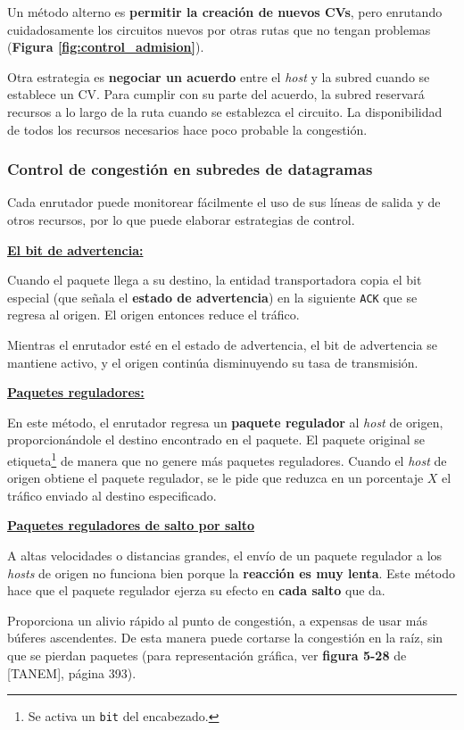 \documentclass[10pt,a4paper]{article}
\begin{document}
Un método alterno es \textbf{permitir la creación de nuevos CVs}, pero enrutando cuidadosamente los circuitos nuevos por otras rutas que no tengan problemas (\textbf{Figura \ref{fig:control_admision}}).

Otra estrategia es \textbf{negociar un acuerdo} entre el \textit{host} y la subred cuando se establece un CV. Para cumplir con su parte del acuerdo, la subred reservará recursos a lo largo de la ruta cuando se establezca el circuito. La disponibilidad de todos los recursos necesarios hace poco probable la congestión.

\subsubsection{Control de congestión en subredes de datagramas}

Cada enrutador puede monitorear fácilmente el uso de sus líneas de salida y de otros recursos, por lo que puede elaborar estrategias de control.

\underline{\textbf{El bit de advertencia:}}

Cuando el paquete llega a su destino, la entidad transportadora copia el bit especial (que señala el \textbf{estado de advertencia}) en la siguiente \texttt{ACK} que se regresa al origen. El origen entonces reduce el tráfico.

Mientras el enrutador esté en el estado de advertencia, el bit de advertencia se mantiene activo, y el origen continúa disminuyendo su tasa de transmisión.

\underline{\textbf{Paquetes reguladores:}}

En este método, el enrutador regresa un \textbf{paquete regulador} al \textit{host} de origen, proporcionándole el destino encontrado en el paquete. El paquete original se etiqueta\footnote{Se activa un \texttt{bit} del encabezado.} de manera que no genere más paquetes reguladores. 
Cuando el \textit{host} de origen obtiene el paquete regulador, se le pide que reduzca en un porcentaje $X$ el tráfico enviado al destino especificado.

\underline{\textbf{Paquetes reguladores de salto por salto}}

A altas velocidades o distancias grandes, el envío de un paquete regulador a los \textit{hosts} de origen no funciona bien porque la \textbf{reacción es muy lenta}. Este método hace que el paquete regulador ejerza su efecto en \textbf{cada salto} que da.

Proporciona un alivio rápido al punto de congestión, a expensas de usar más búferes ascendentes. De esta manera puede cortarse la congestión en la raíz, sin que se pierdan paquetes (para representación gráfica, ver \textbf{figura 5-28} de [TANEM], página 393).
\end{document}
